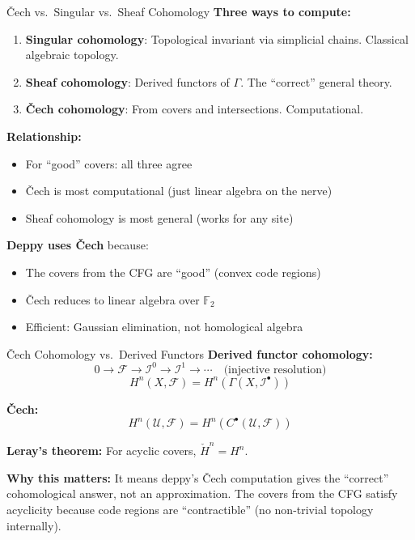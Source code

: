 \documentclass[aspectratio=169,10pt]{beamer}
\newcommand{\Fscr}{\mathcal{F}}
\newcommand{\Uscr}{\mathcal{U}}
\begin{document}
\begin{frame}{\v{C}ech vs.\ Singular vs.\ Sheaf Cohomology}
\textbf{Three ways to compute:}

\begin{enumerate}
  \item \textbf{Singular cohomology}: Topological invariant via simplicial chains. Classical algebraic topology.
  \item \textbf{Sheaf cohomology}: Derived functors of $\Gamma$. The ``correct'' general theory.
  \item \textbf{\v{C}ech cohomology}: From covers and intersections. Computational.
\end{enumerate}

\textbf{Relationship:}
\begin{itemize}
  \item For ``good'' covers: all three agree
  \item \v{C}ech is most computational (just linear algebra on the nerve)
  \item Sheaf cohomology is most general (works for any site)
\end{itemize}

\textbf{Deppy uses \v{C}ech} because:
\begin{itemize}
  \item The covers from the CFG are ``good'' (convex code regions)
  \item \v{C}ech reduces to linear algebra over $\mathbb{F}_2$
  \item Efficient: Gaussian elimination, not homological algebra
\end{itemize}
\end{frame}

\begin{frame}{\v{C}ech Cohomology vs.\ Derived Functors}
\textbf{Derived functor cohomology:}
\[
0 \to \Fscr \to \mathcal{I}^0 \to \mathcal{I}^1 \to \cdots \quad\text{(injective resolution)}
\]
\[
H^n(X, \Fscr) = H^n(\Gamma(X, \mathcal{I}^\bullet))
\]

\textbf{\v{C}ech:}
\[
H^n(\Uscr, \Fscr) = H^n(C^\bullet(\Uscr, \Fscr))
\]

\textbf{Leray's theorem:} For acyclic covers, $\check{H}^n = H^n$.

\textbf{Why this matters:} It means deppy's \v{C}ech computation gives the ``correct'' cohomological answer, not an approximation. The covers from the CFG satisfy acyclicity because code regions are ``contractible'' (no non-trivial topology internally).
\end{frame}
\end{document}
